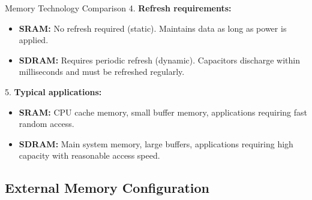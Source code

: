 \begin{example2}{Memory Technology Comparison}
4. \textbf{Refresh requirements:}
   \begin{itemize}
     \item \textbf{SRAM:} No refresh required (static). Maintains data as long as power is applied.
     \item \textbf{SDRAM:} Requires periodic refresh (dynamic). Capacitors discharge within milliseconds and must be refreshed regularly.
   \end{itemize}

5. \textbf{Typical applications:}
   \begin{itemize}
     \item \textbf{SRAM:} CPU cache memory, small buffer memory, applications requiring fast random access.
     \item \textbf{SDRAM:} Main system memory, large buffers, applications requiring high capacity with reasonable access speed.
   \end{itemize}
\end{example2}

\subsection{External Memory Configuration}

